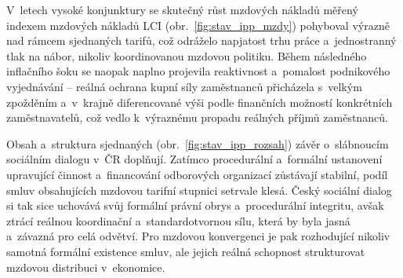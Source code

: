 V~letech vysoké konjunktury se skutečný růst mzdových nákladů měřený indexem mzdových nákladů \ac{LCI} (obr.~\ref{fig:stav_ipp_mzdy}) pohyboval výrazně nad rámcem sjednaných tarifů, což odráželo napjatost trhu práce a~jednostranný tlak na nábor, nikoliv koordinovanou mzdovou politiku. Během následného inflačního šoku se naopak naplno projevila reaktivnost a~pomalost podnikového vyjednávání -- reálná ochrana kupní síly zaměstnanců přicházela s~velkým zpožděním a~v~krajně diferencované výši podle finančních možností konkrétních zaměstnavatelů, což vedlo k~výraznému propadu reálných příjmů zaměstnanců.\par



Obsah a~struktura sjednaných  (obr.~\ref{fig:stav_ipp_rozsah}) závěr o~slábnoucím sociálním dialogu v~\acs{ČR} doplňují. Zatímco procedurální a~formální ustanovení upravující činnost a~financování odborových organizací zůstávají stabilní, podíl smluv obsahujících mzdovou tarifní stupnici setrvale klesá. Český sociální dialog si tak sice uchovává svůj formální právní obrys a~procedurální integritu, avšak ztrácí reálnou koordinační a~standardotvornou sílu, která by byla jasná a~závazná pro celá odvětví. Pro mzdovou konvergenci je pak rozhodující nikoliv samotná formální existence smluv, ale jejich reálná schopnost strukturovat mzdovou distribuci v~ekonomice.\par



